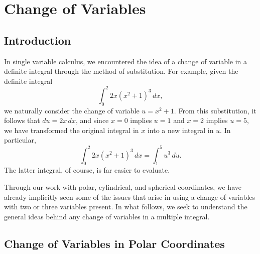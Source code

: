 \section{Change of Variables} \label{S:11.9.Change_of_Variable}

\vspace*{-14 pt}

\subsection*{Introduction}

In single variable calculus, we encountered the idea of a change of variable in a definite integral through the method of substitution. For example, given the definite integral
\[\int_0^2 2x(x^2+1)^3 \, dx, \]
we naturally consider the change of variable $u = x^2+1$.  From this substitution, it follows that $du = 2x \, dx$, and since $x = 0$ implies $u = 1$ and $x = 2$ implies $u = 5$, we have transformed the original integral in $x$ into a new integral in $u$.  In particular,
\[\int_0^2 2x(x^2+1)^3 \, dx = \int_1^5 u^3 \, du.\]
The latter integral, of course, is far easier to evaluate.

Through our work with polar, cylindrical, and spherical coordinates, we have already implicitly seen some of the issues that arise in using a change of variables with two or three variables present.  In what follows, we seek to understand the general ideas behind any change of variables in a multiple integral.



\subsection*{Change of Variables in Polar Coordinates}


